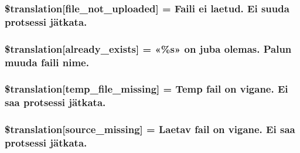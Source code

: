 \subsubsection[{\$translation}]{\setlength{\rightskip}{0pt plus 5cm}\$translation\mbox{[}\textquotesingle{}file\+\_\+not\+\_\+uploaded\textquotesingle{}\mbox{]} = \textquotesingle{}Faili ei laetud. Ei suuda protsessi jätkata.\textquotesingle{}}\label{class_8upload_8et___e_e_8php_a4ce76e7be0b3a03c2b47f6d70c21832e}
\hypertarget{class_8upload_8et___e_e_8php_afd84e910217f04139f567c41e292afa5}{}
\subsubsection[{\$translation}]{\setlength{\rightskip}{0pt plus 5cm}\$translation\mbox{[}\textquotesingle{}already\+\_\+exists\textquotesingle{}\mbox{]} = \textquotesingle{}«\%s» on juba olemas. Palun muuda faili nime.\textquotesingle{}}\label{class_8upload_8et___e_e_8php_afd84e910217f04139f567c41e292afa5}
\hypertarget{class_8upload_8et___e_e_8php_ab0fa87a88aba2624004581eed0633325}{}
\subsubsection[{\$translation}]{\setlength{\rightskip}{0pt plus 5cm}\$translation\mbox{[}\textquotesingle{}temp\+\_\+file\+\_\+missing\textquotesingle{}\mbox{]} = \textquotesingle{}Temp fail on vigane. Ei saa protsessi jätkata.\textquotesingle{}}\label{class_8upload_8et___e_e_8php_ab0fa87a88aba2624004581eed0633325}
\hypertarget{class_8upload_8et___e_e_8php_aceaaf7355acaaf10f0ae60378d03c468}{}
\subsubsection[{\$translation}]{\setlength{\rightskip}{0pt plus 5cm}\$translation\mbox{[}\textquotesingle{}source\+\_\+missing\textquotesingle{}\mbox{]} = \textquotesingle{}Laetav fail on vigane. Ei saa protsessi jätkata.\textquotesingle{}}\label{class_8upload_8et___e_e_8php_aceaaf7355acaaf10f0ae60378d03c468}
\hypertarget{class_8upload_8et___e_e_8php_aff2427c72a2598aefa6d58df1dd18b08}{}
